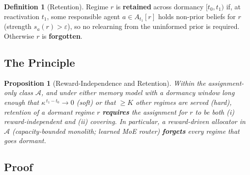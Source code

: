 \documentclass[11pt,a4paper]{article}
\theoremstyle{definition}
\newtheorem{definition}{Definition}[section]
\theoremstyle{plain}
\newtheorem{proposition}{Proposition}[section]
\begin{document}
\begin{definition}[Retention]
Regime $r$ is \textbf{retained} across dormancy $[t_0,t_1)$ if, at reactivation
$t_1$, some responsible agent $a \in A_{t_1}[r]$ holds non-prior beliefs for $r$
(strength $s_a(r) > \varepsilon$), so no relearning from the uninformed prior is
required. Otherwise $r$ is \textbf{forgotten}.
\end{definition}

\subsection{The Principle}

\begin{proposition}[Reward-Independence and Retention]
\label{prop:reward_independence}
Within the assignment-only class $\mathcal{A}$, and under either memory model with
a dormancy window long enough that $\kappa^{\,t_1 - t_0} \!\to\! 0$ (soft) or that
$\ge K$ other regimes are served (hard), retention of a dormant regime $r$
\textbf{requires} the assignment for $r$ to be both \emph{(i) reward-independent}
and \emph{(ii) covering}. In particular, a reward-driven allocator in
$\mathcal{A}$ (capacity-bounded monolith; learned MoE router) \textbf{forgets}
every regime that goes dormant.
\end{proposition}

\subsection{Proof}
\end{document}
